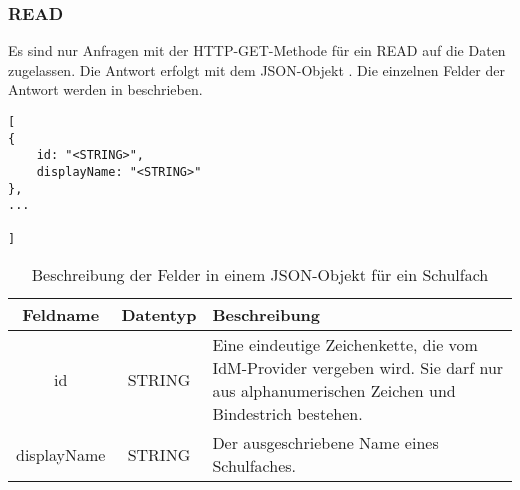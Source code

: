 \subsubsection{READ}
\label{sec:end:rest:api:school-subjects:read}
Es sind nur Anfragen mit der HTTP-GET-Methode für ein READ auf die Daten zugelassen.
Die Antwort erfolgt mit dem JSON-Objekt . Die einzelnen Felder der Antwort werden in  beschrieben.

\begin{lstlisting}[caption={JSON-Antwort für einen GET-Aufruf des Pfads /api/school-subjects},label={lst:code:end:rest:api:school-subjects:read:ret},frame=tlrb]
[
{
	id: "<STRING>",
	displayName: "<STRING>"
},
...

]
\end{lstlisting}
\begin{table}[htb]
	\begin{tabularx}{\textwidth}{|c|c|X|}
		\hline
			\textbf{Feldname} & \textbf{Datentyp} & \textbf{Beschreibung} \\ \hline
			id & STRING & Eine eindeutige Zeichenkette, die vom IdM-Provider vergeben wird. Sie darf nur aus alphanumerischen Zeichen und Bindestrich bestehen.\\ \hline
			displayName & STRING & Der ausgeschriebene Name eines Schulfaches. \\ \hline
	\end{tabularx}

		\caption{Beschreibung der Felder in einem JSON-Objekt für ein Schulfach}
		\label{tab:end:rest:api:school-subjects:read:ret:json}
\end{table}